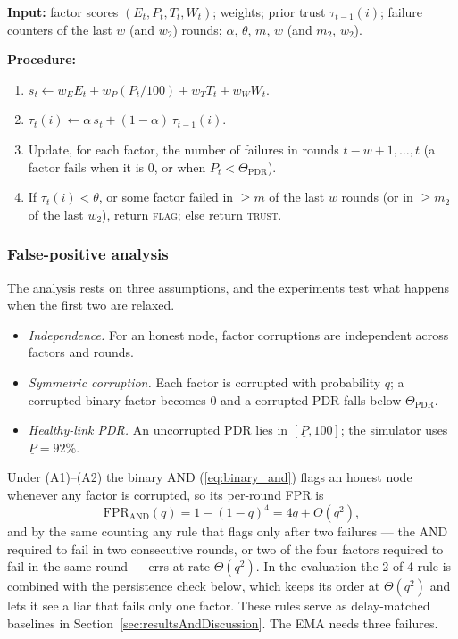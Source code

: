 \begin{algorithm}[!t]
\caption{Extension~I trust update for node $i$ at round $t$.}
\label{alg:ema}
\noindent\textbf{Input:} factor scores $(E_t,P_t,T_t,W_t)$; weights;
prior trust $\tau_{t-1}(i)$; failure counters of the last $w$ (and
$w_2$) rounds; $\alpha$, $\theta$, $m$, $w$ (and $m_2$, $w_2$).

\noindent\textbf{Procedure:}
\begin{enumerate}\setlength{\itemsep}{0pt}\setlength{\parskip}{0pt}
  \item $s_t \gets w_E E_t + w_P (P_t/100) + w_T T_t + w_W W_t$.
  \item $\tau_t(i) \gets \alpha\,s_t + (1-\alpha)\,\tau_{t-1}(i)$.
  \item Update, for each factor, the number of failures in rounds
        $t-w+1,\dots,t$ (a factor fails when it is $0$, or when
        $P_t<\Theta_{\mathrm{PDR}}$).
  \item If $\tau_t(i)<\theta$, or some factor failed in $\ge m$ of the
        last $w$ rounds (or in $\ge m_2$ of the last $w_2$), return
        \textsc{flag}; else return \textsc{trust}.
\end{enumerate}
\end{algorithm}

\subsubsection{False-positive analysis}
The analysis rests on three assumptions, and the experiments test what
happens when the first two are relaxed.
\begin{itemize}
\item[(A1)] \emph{Independence.}  For an honest node, factor
corruptions are independent across factors and rounds.
\item[(A2)] \emph{Symmetric corruption.}  Each factor is corrupted
with probability $q$; a corrupted binary factor becomes $0$ and a
corrupted PDR falls below $\Theta_{\mathrm{PDR}}$.
\item[(A3)] \emph{Healthy-link PDR.}  An uncorrupted PDR lies in
$[\underline{P},100]$; the simulator uses $\underline{P}=92\%$.
\end{itemize}
Under (A1)--(A2) the binary AND (\ref{eq:binary_and}) flags an honest
node whenever any factor is corrupted, so its per-round FPR is
\begin{equation}
\mathrm{FPR}_{\mathrm{AND}}(q) = 1-(1-q)^{4} = 4q + O(q^{2}),
\label{eq:fpr_and}
\end{equation}
and by the same counting any rule that flags only after two failures
--- the AND required to fail in two consecutive rounds, or two of the
four factors required to fail in the same round --- errs at rate
$\Theta(q^{2})$.  In the evaluation the 2-of-4 rule is combined with
the persistence check below, which keeps its order at $\Theta(q^{2})$
and lets it see a liar that fails only one factor.  These rules serve as delay-matched baselines in
Section~\ref{sec:resultsAndDiscussion}.  The EMA needs three failures.

